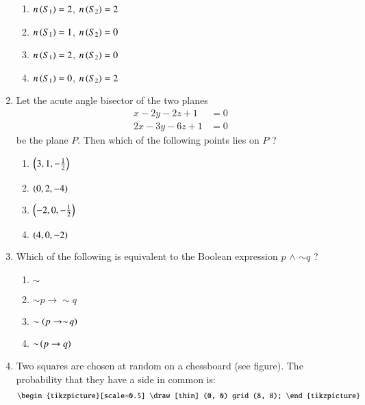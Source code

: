 \documentclass[journal,12pt,onecolumn]{IEEEtran}
\theoremstyle{remark}
\begin{document}
\begin{enumerate}
\begin{multicols}{2}
    \begin{enumerate}
    \item $n\left(S_1\right) = 2$, $n\left(S_2\right) = 2$
    \item $n\left(S_1\right) = 1$, $n\left(S_2\right) = 0$
   \item $n\left(S_1\right) = 2$, $n\left(S_2\right) = 0$
    \item $n\left(S_1\right) = 0$, $n\left(S_2\right) = 2$
    \end{enumerate}
\end{multicols}

\item Let the acute angle bisector of the two planes
\begin{align*}
x - 2y - 2z + 1 &= 0 \\
2x - 3y - 6z + 1 &= 0
\end{align*}
be the plane $P$. Then which of the following points lies on $P$ ?
\begin{multicols}{2}
\begin{enumerate}
    \item $\left( 3, 1, -\frac{1}{2} \right)$ \\
    \item $\left(0, 2, -4\right)$
     \item $\left( -2, 0, -\frac{1}{2} \right)$ \\
    \item $\left(4, 0, -2\right)$
\end{enumerate}
\end{multicols}

\item Which of the following is equivalent to the Boolean expression $p$  $\land$ $\sim$$q$ ?
\begin{multicols}{4}
\begin{enumerate}
    \item $\sim$ 
    \item  $\sim\!p \to  \sim\!q$
    \item $\sim\left(p \to  \sim\!q\right)$
    \item $\sim\!\left(p \to q\right)$ 
\end{enumerate}
\end{multicols}

\item Two squares are chosen at random on a chessboard (see figure). The probability that they have a side in common is:
\begin{align}
\begin{tikzpicture}[scale=0.5]
    \draw[thin] (0, 0) grid (8, 8);
\end{tikzpicture}
\end{align}



\end{enumerate}
\end{document}
